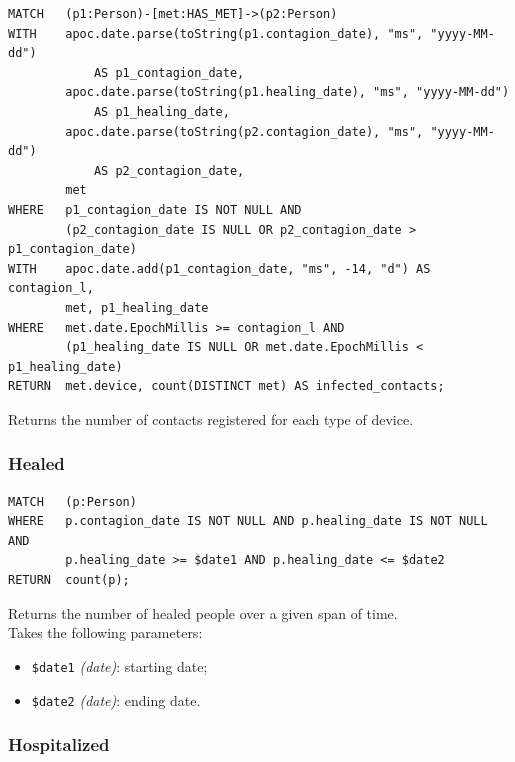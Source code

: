 \documentclass[12pt, a4paper]{article}
\begin{document}
\begin{tcolorbox}[fontupper=\scriptsize]
    \begin{verbatim}
MATCH   (p1:Person)-[met:HAS_MET]->(p2:Person)
WITH    apoc.date.parse(toString(p1.contagion_date), "ms", "yyyy-MM-dd") 
            AS p1_contagion_date,
        apoc.date.parse(toString(p1.healing_date), "ms", "yyyy-MM-dd") 
            AS p1_healing_date,
        apoc.date.parse(toString(p2.contagion_date), "ms", "yyyy-MM-dd") 
            AS p2_contagion_date,
        met
WHERE   p1_contagion_date IS NOT NULL AND
        (p2_contagion_date IS NULL OR p2_contagion_date > p1_contagion_date)
WITH    apoc.date.add(p1_contagion_date, "ms", -14, "d") AS contagion_l,
        met, p1_healing_date
WHERE   met.date.EpochMillis >= contagion_l AND
        (p1_healing_date IS NULL OR met.date.EpochMillis < p1_healing_date)
RETURN  met.device, count(DISTINCT met) AS infected_contacts;
    \end{verbatim}
\end{tcolorbox}

\noindent %
Returns the number of contacts registered for each type of device. 

\subsubsection{Healed}
\begin{tcolorbox}[fontupper=\scriptsize]
    \begin{verbatim}
MATCH   (p:Person)
WHERE   p.contagion_date IS NOT NULL AND p.healing_date IS NOT NULL AND
        p.healing_date >= $date1 AND p.healing_date <= $date2
RETURN  count(p);
    \end{verbatim}
\end{tcolorbox}

\noindent %
Returns the number of healed people over a given span of time. \\
Takes the following parameters: 
\begin{itemize}
    \item \texttt{\$date1} \emph{(date)}: starting date;
    \item \texttt{\$date2} \emph{(date)}: ending date.
\end{itemize}

\subsubsection{Hospitalized}
\end{document}
